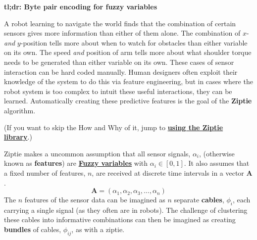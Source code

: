 \label{sec:intro}

\textbf{tl;dr: Byte pair encoding for fuzzy variables}

A robot learning to navigate the world finds that the
combination of
certain sensors gives more information than either of them alone.
The combination of $x$- \textit{and} $y$-position tells more about
when to watch for obstacles than either variable on its own.
The speed \textit{and} position of arm tells more about what shoulder
torque needs to be generated than either variable on its own.
These cases
of sensor interaction can be hard coded manually. Human designers
often exploit their knowledge of the system to do this
via feature engineering,
but in cases where the robot system is too complex
to intuit these useful interactions, they can be learned.
Automatically creating these predictive features is the goal of 
the \textbf{Ziptie} algorithm.

(If you want to skip the How and Why of it, jump to
\textbf{\hyperref[sec:code]{using the Ziptie library}}.)

Ziptie makes a uncommon assumption that all sensor signals,
$\alpha_i$, (otherwise known as \textbf{features}) are
\textbf{\hyperref[sec:fuzzy]{Fuzzy variables}} with
$\alpha_i \in [0, 1]$. It also assumes that
a fixed number of features, $n$, are
received at discrete time intervals in a vector $\mathbf{A}$.
\begin{equation}
\mathbf{A} = (\alpha_1, \alpha_2, \alpha_3, ..., \alpha_n)
\end{equation}
The $n$ features of the sensor data
can be imagined as $n$ separate 
\textbf{cables}, $\phi_i$, each carrying a single signal
(as they often are in robots). The
challenge of clustering these cables into informative combinations
can then be imagined as creating \textbf{bundles} of cables, $\phi_{ij}$,
as with a ziptie.


